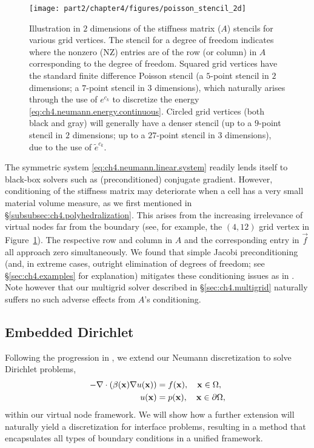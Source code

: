 \setlength{\figurewidth}{\textwidth}
\begin{figure}[htb]
\centering
\texttt{[image: part2/chapter4/figures/poisson\_stencil\_2d]}
\caption{Illustration in $2$ dimensions of the stiffness matrix ($A$) stencils for various grid vertices. The stencil for a degree of freedom indicates where the nonzero (NZ) entries are of the row (or column) in $A$ corresponding to the degree of freedom. Squared grid vertices have the standard finite difference Poisson stencil (a $5$-point stencil in $2$ dimensions; a $7$-point stencil in $3$ dimensions), which naturally arises through the use of $e^{c_k}$ to discretize the energy \eqref{eq:ch4.neumann.energy.continuous}. Circled grid vertices (both black and gray) will generally have a denser stencil (up to a $9$-point stencil in $2$ dimensions; up to a $27$-point stencil in $3$ dimensions), due to the use of $\tilde{e}^{c_k}$.}
\label{fig:ch4.poisson.stencil}
\end{figure}

The symmetric system \eqref{eq:ch4.neumann.linear.system} readily lends itself to black-box solvers such as (preconditioned) conjugate gradient. However, conditioning of the stiffness matrix may deteriorate when a cell has a very small material volume measure, as we first mentioned in \S\ref{subsubsec:ch4.polyhedralization}. This arises from the increasing irrelevance of virtual nodes far from the boundary (see, for example, the $(4,12)$ grid vertex in Figure~\ref{fig:ch4.poisson.stencil}). The respective row and column in $A$ and the corresponding entry in $\vec{f}$ all approach zero simultaneously. We found that simple Jacobi preconditioning (and, in extreme cases, outright elimination of degrees of freedom; see \S\ref{sec:ch4.examples} for explanation) mitigates these conditioning issues as in \cite{Bedrossian10}. Note however that our multigrid solver described in \S\ref{sec:ch4.multigrid} naturally suffers no such adverse effects from $A$'s conditioning.

\subsection{Embedded Dirichlet} \label{subsec:ch4.discretization.dirichlet}

Following the progression in \cite{Bedrossian10}, we extend our Neumann discretization to solve Dirichlet problems,
\begin{equation} \label{eq:ch4.dirichlet}
\begin{split}
-\nabla \cdot \left( \beta(\mathbf{x}) \nabla u(\mathbf{x}) \right) & = f(\mathbf{x}), \quad  \mathbf{x} \in \Omega, \\
u(\mathbf{x}) & = p(\mathbf{x}), \quad \mathbf{x} \in \partial\Omega,
\end{split}
\end{equation}
within our virtual node framework. We will show how a further extension will naturally yield a discretization for interface problems, resulting in a method that encapsulates all types of boundary conditions in a unified framework.

